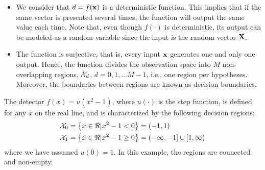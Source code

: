 \begin{itemize}
    \item We consider that $d = f({\bf x})$ is a deterministic function. This implies that if the same vector is presented several times, the function will output the same value each time. Note that, even though $f(\cdot)$ is deterministic, its output can be modeled as a random variable since the input is the random vector $\bf X$.
    \item The function is surjective, that is, every input ${\bf x}$ generates one and only one output. Hence, the function divides the observation space into $M$ non-overlapping regions, ${\cal X}_d$, $d = 0, 1, \ldots M-1$, i.e., one region per hypotheses. Moreover, the boundaries between regions are known as decision boundaries.
\end{itemize}

\begin{example}
The detector $f(x) = u(x^2 -1)$, where $u(\cdot)$ is the step function, is defined for any $x$ on the real line, and is characterized by the following decision regions:
\begin{align}{\cal X}_0 & = \left\{ x \in \Re | x^2-1 < 0\right\} = (-1,1) \nonumber\\
{\cal X}_1 & = \left\{ x \in \Re | x^2-1 \geq 0\right\} = (-\infty,-1] \cup [1,\infty) \nonumber
\end{align}
where we have assumed $u(0)=1$. In this example, the regions are connected and non-empty.
\end{example}

